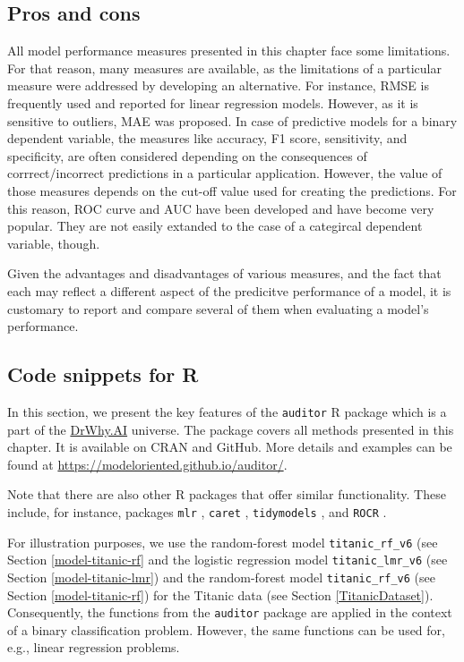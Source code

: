 \documentclass[12pt,]{krantz}
\begin{document}
\hypertarget{modelPerformanceProsCons}{%
\subsection{Pros and cons}\label{modelPerformanceProsCons}}

All model performance measures presented in this chapter face some limitations. For that reason, many measures are available, as the limitations of a particular measure were addressed by developing an alternative. For instance, RMSE is frequently used and reported for linear regression models. However, as it is sensitive to outliers, MAE was proposed. In case of predictive models for a binary dependent variable, the measures like accuracy, F1 score, sensitivity, and specificity, are often considered depending on the consequences of corrrect/incorrect predictions in a particular application. However, the value of those measures depends on the cut-off value used for creating the predictions. For this reason, ROC curve and AUC have been developed and have become very popular. They are not easily extanded to the case of a categircal dependent variable, though.

Given the advantages and disadvantages of various measures, and the fact that each may reflect a different aspect of the predicitve performance of a model, it is customary to report and compare several of them when evaluating a model's performance.

\hypertarget{modelPerformanceR}{%
\subsection{Code snippets for R}\label{modelPerformanceR}}

In this section, we present the key features of the \texttt{auditor} R package \citep{auditor} which is a part of the \href{http://DrWhy.AI}{DrWhy.AI} universe. The package covers all methods presented in this chapter. It is available on CRAN and GitHub. More details and examples can be found at \url{https://modeloriented.github.io/auditor/}.

Note that there are also other R packages that offer similar functionality. These include, for instance, packages \texttt{mlr} \citep{mlr}, \texttt{caret} \citep{caret}, \texttt{tidymodels} \citep{tidymodels}, and \texttt{ROCR} \citep{ROCR}.

For illustration purposes, we use the random-forest model \texttt{titanic\_rf\_v6} (see Section \ref{model-titanic-rf} and the logistic regression model \texttt{titanic\_lmr\_v6} (see Section \ref{model-titanic-lmr}) and the random-forest model \texttt{titanic\_rf\_v6} (see Section \ref{model-titanic-rf}) for the Titanic data (see Section \ref{TitanicDataset}). Consequently, the functions from the \texttt{auditor} package are applied in the context of a binary classification problem. However, the same functions can be used for, e.g., linear regression problems.
\end{document}
